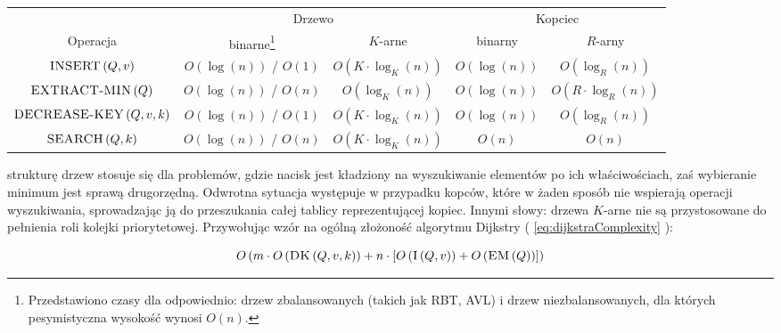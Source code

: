 \begin{center}
	\begin{savenotes}
		\begin{tabular}{ccccc}
			& \multicolumn{2}{c}{Drzewo} & \multicolumn{2}{c}{Kopciec} \\
			\cline{2-5}
			Operacja & binarne\footnote{Przedstawiono czasy dla odpowiednio: drzew zbalansowanych (takich jak RBT, AVL) i drzew niezbalansowanych, dla których pesymistyczna wysokość wynosi $O \left( n\right)$.} & $K$-arne & binarny & $R$-arny \\
			\hline
			$\textrm{\textsc{INSERT}} \left( Q, v \right)$ & $ O \left( \log \left( n \right) \right)$ / $ O \left( 1 \right) $ & $O \left( K \cdot \log_{K} \left( n \right) \right)$ & $O \left( \log \left( n \right) \right)$ & $O \left( \log_{R} \left( n \right) \right)$ \\
			$\textrm{\textsc{EXTRACT-MIN}} \left( Q \right)$ & $ O \left( \log \left( n \right) \right)$  / $ O \left( n \right) $ & $ O \left( \log_{K} \left( n\right) \right)$ & $O \left( \log \left( n \right) \right)$ & $O \left( R \cdot \log_{R} \left( n \right) \right)$ \\
			$\textrm{\textsc{DECREASE-KEY}} \left( Q, v, k \right)$ & $ O \left( \log \left( n \right) \right)$  / $ O \left( 1 \right) $ & $O \left( K \cdot \log_{K} \left( n \right) \right)$ & $O \left( \log \left( n \right) \right)$ & $O \left( \log_{R} \left( n \right) \right)$  \\
			$\textrm{\textsc{SEARCH}} \left( Q, k \right)$ & $ O \left( \log \left( n \right) \right)$ / $ O \left( n \right) $ & $O \left( K \cdot \log_{K} \left( n \right) \right)$ & $O \left( n \right)$ & $ O \left( n \right) $  \\
			\hline
		\end{tabular}
	\end{savenotes}
\end{center}

strukturę drzew stosuje się dla problemów, gdzie nacisk jest kładziony na wyszukiwanie elementów po ich właściwościach, zaś wybieranie minimum jest sprawą drugorzędną. Odwrotna sytuacja występuje w przypadku kopców, które w żaden sposób nie wspierają operacji wyszukiwania, sprowadzając ją do przeszukania całej tablicy reprezentującej kopiec. Innymi słowy: drzewa $K$-arne nie są przystosowane do pełnienia roli kolejki priorytetowej. Przywołując wzór na ogólną złożoność algorytmu Dijkstry ( \ref{eq:dijkstraComplexity} ):

\begin{equation}
O \left( m \cdot O \left( \textrm{\textsc{DK}} \left( Q, v, k \right) \right) + n \cdot \left[ O \left( \textrm{\textsc{I}} \left( Q, v \right) \right) + O \left( \textrm{\textsc{EM}} \left( Q \right) \right) \right] \right)
\end{equation}\label{eq:dijkstraComplexityShort}

